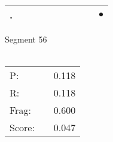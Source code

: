 \documentclass[landscape]{article}
\newcommand{\ssp}{\hspace{2pt}}
\newcommand{\mex}{\cellcolor{g}$\bullet$}
\begin{document}
\begin{tabular}{|l|p{10pt}|p{10pt}|p{10pt}|p{10pt}|p{10pt}|p{10pt}|p{10pt}|p{10pt}|p{10pt}|}
\hline
\ssp \cellcolor{ref8}. \ssp&\hspace{2pt}&\hspace{2pt}&\hspace{2pt}&\hspace{2pt}&\hspace{2pt}&\hspace{2pt}&\hspace{2pt}&\hspace{2pt}&\hspace{2pt}\mex\\
\hline
\end{tabular}

\vspace{6pt}
\noindent Segment 56\\\\
\noindent\begin{tabular}{lm{12pt}r}
\hline
P:&&0.118\\
R:&&0.118\\
Frag:&&0.600\\
Score:&&0.047\\
\end{tabular}

\newpage
\end{document}
